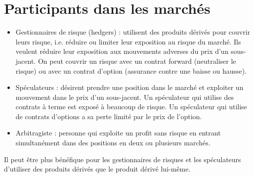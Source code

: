 \section{Participants dans les marchés}

\begin{itemize}
	\item Gestionnaires de risque (hedgers) : utilisent des produits dérivés pour couvrir leurs risque, i.e. réduire ou limiter leur exposition au risque du marché. Ils veulent réduire leur exposition aux mouvements adverses du prix d'un sous-jacent. On peut couvrir un risque avec un contrat forward (neutraliser le risque) ou avec un contrat d'option (assurance contre une baisse ou hausse). 
	\item Spéculateurs : désirent prendre une position dans le marché et exploiter un mouvement dans le prix d'un sous-jacent. Un spéculateur qui utilise des contrats à terme est exposé à beaucoup de risque. Un spéculateur qui utilise de contrats d'options a sa perte limité par le prix de l'option. 
	\item Arbitragiste : personne qui exploite un profit sans risque en entrant simultanément dans des positions en deux ou plusieurs marchés. 
\end{itemize}

Il peut être plus bénéfique pour les gestionnaires de risques et les spéculateurs d'utiliser des produits dérivés que le produit dérivé lui-même. 

